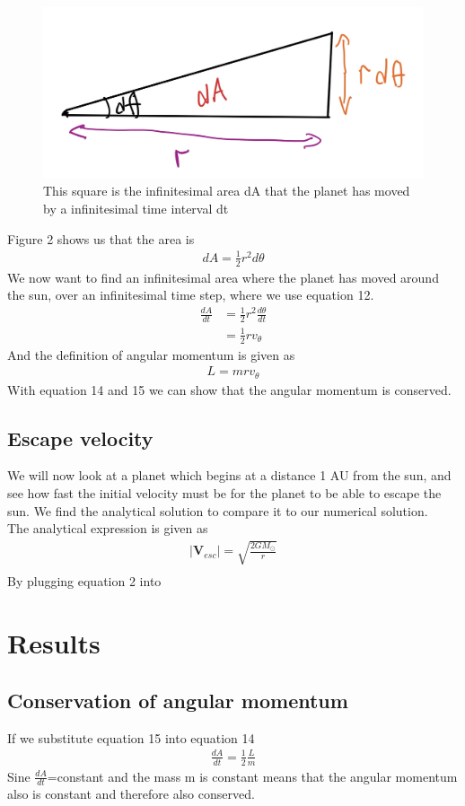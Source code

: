 \documentclass{article}
\begin{document}
\begin{multicols}{2}
\begin{figure}[H]
	\centering
	\includegraphics[width=\linewidth]{sketch.jpg}
	\caption{This square is the infinitesimal area dA that the planet has moved by a infinitesimal time interval dt}
	\label{fig:1bplot}
\end{figure}
Figure 2 shows us that the area is 
\begin{align}
    dA=\frac{1}{2}r^2d\theta
\end{align}
We now want to find an infinitesimal area where the planet has moved around the sun, over an infinitesimal time step, where we use equation 12.
\begin{align}
    \frac{dA}{dt}&=\frac{1}2{r^2}\frac{d\theta}{dt}\\
    &=\frac{1}{2}rv_\theta
\end{align}
And the definition of angular momentum is given as
\begin{align}
    L=mrv_\theta
\end{align}
With equation 14 and 15 we can show that the angular momentum is conserved. \subsection{Escape velocity}
We will now look at a planet which begins at a distance 1 AU from the sun, 
and see how fast the initial velocity must be for the planet to be able to escape the sun. We find the analytical solution to compare it to our numerical solution. \\
The analytical expression is given as 
\begin{align}
    \mid{\mathbf{V}_{esc}}\mid=\sqrt{\frac{2GM_{\odot}}{r}} \\
\end{align}
By plugging equation 2 into 
\section{Results}
\subsection{Conservation of angular momentum}
If we substitute equation 15 into equation 14 
\begin{align}
    \frac{dA}{dt}=\frac{1}{2}\frac{L}{m}
\end{align}
Sine $\frac{dA}{dt}$=constant and the mass m is constant means that the angular momentum also is constant and therefore also conserved.  
\end{multicols}
\end{document}
